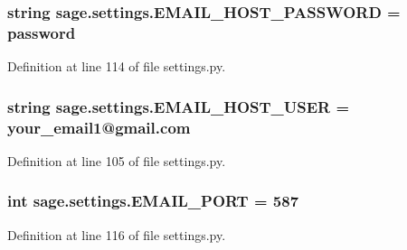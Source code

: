 \subsubsection[{E\+M\+A\+I\+L\+\_\+\+H\+O\+S\+T\+\_\+\+P\+A\+S\+S\+W\+O\+R\+D}]{\setlength{\rightskip}{0pt plus 5cm}string sage.\+settings.\+E\+M\+A\+I\+L\+\_\+\+H\+O\+S\+T\+\_\+\+P\+A\+S\+S\+W\+O\+R\+D = \textquotesingle{}password\textquotesingle{}}\label{namespacesage_1_1settings_a66e7a16ed6b0df5716a6579fcba949a6}


Definition at line 114 of file settings.\+py.

\hypertarget{namespacesage_1_1settings_a9c01855359753a3c3f517341806347c2}{}
\subsubsection[{E\+M\+A\+I\+L\+\_\+\+H\+O\+S\+T\+\_\+\+U\+S\+E\+R}]{\setlength{\rightskip}{0pt plus 5cm}string sage.\+settings.\+E\+M\+A\+I\+L\+\_\+\+H\+O\+S\+T\+\_\+\+U\+S\+E\+R = \textquotesingle{}your\+\_\+email1@gmail.\+com\textquotesingle{}}\label{namespacesage_1_1settings_a9c01855359753a3c3f517341806347c2}


Definition at line 105 of file settings.\+py.

\hypertarget{namespacesage_1_1settings_a3fe927460bba6408b5df39fa8a10d367}{}
\subsubsection[{E\+M\+A\+I\+L\+\_\+\+P\+O\+R\+T}]{\setlength{\rightskip}{0pt plus 5cm}int sage.\+settings.\+E\+M\+A\+I\+L\+\_\+\+P\+O\+R\+T = 587}\label{namespacesage_1_1settings_a3fe927460bba6408b5df39fa8a10d367}


Definition at line 116 of file settings.\+py.

\hypertarget{namespacesage_1_1settings_a0fe7c4174cb1b7d03f7b574ae1e5eed9}{}
